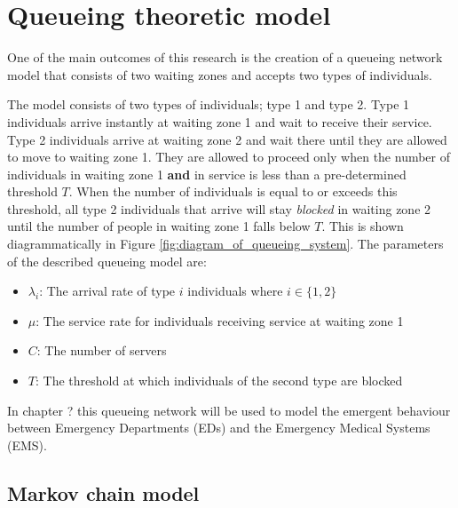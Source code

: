 \section{Queueing theoretic model}\label{sec:queueing-section}

One of the main outcomes of this research is the creation of a queueing network
model that consists of two waiting zones and accepts two types of individuals.



The model consists of two types of individuals; type 1 and type 2.
Type 1 individuals arrive instantly at waiting zone 1 and wait to receive their
service.
Type 2 individuals arrive at waiting zone 2 and wait there until they are
allowed to move to waiting zone 1.
They are allowed to proceed only when the number of
individuals in waiting zone 1 \textbf{and} in service is less than a
pre-determined threshold \(T\).
When the number of individuals is equal to or exceeds this threshold, all
type 2 individuals that arrive will stay \textit{blocked} in waiting zone 2
until the number of people in waiting zone 1 falls below \(T\).
This is shown diagrammatically in Figure \ref{fig:diagram_of_queueing_system}.
The parameters of the described queueing model are:

\begin{itemize}
    \item \(\lambda_i\): The arrival rate of type \(i\) individuals where
    \(i\in\{1, 2\}\)
    \item \(\mu\): The service rate for individuals receiving service at
    waiting zone 1
    \item \(C\): The number of servers
    \item \(T\): The threshold at which individuals of the second type are
    blocked
\end{itemize}

In chapter ?
this queueing network will be used to model the emergent behaviour between
Emergency Departments (EDs) and the Emergency Medical Systems (EMS).





\subsection{Markov chain model}

